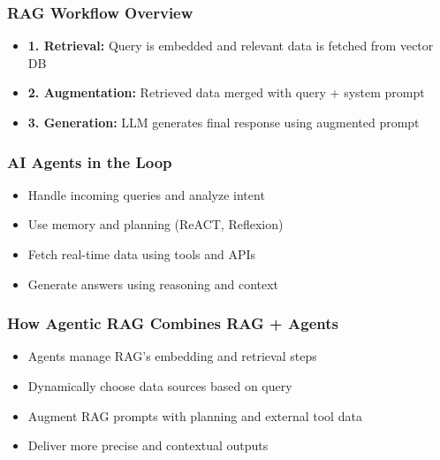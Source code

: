 \begin{frame}[fragile]\frametitle{RAG Workflow Overview}
    \begin{itemize}
        \item \textbf{1. Retrieval:} Query is embedded and relevant data is fetched from vector DB
        \item \textbf{2. Augmentation:} Retrieved data merged with query + system prompt
        \item \textbf{3. Generation:} LLM generates final response using augmented prompt
    \end{itemize}
\end{frame}

\begin{frame}[fragile]\frametitle{AI Agents in the Loop}
    \begin{itemize}
        \item Handle incoming queries and analyze intent
        \item Use memory and planning (ReACT, Reflexion)
        \item Fetch real-time data using tools and APIs
        \item Generate answers using reasoning and context
    \end{itemize}
\end{frame}

\begin{frame}[fragile]\frametitle{How Agentic RAG Combines RAG + Agents}
    \begin{itemize}
        \item Agents manage RAG's embedding and retrieval steps
        \item Dynamically choose data sources based on query
        \item Augment RAG prompts with planning and external tool data
        \item Deliver more precise and contextual outputs
    \end{itemize}
\end{frame}

